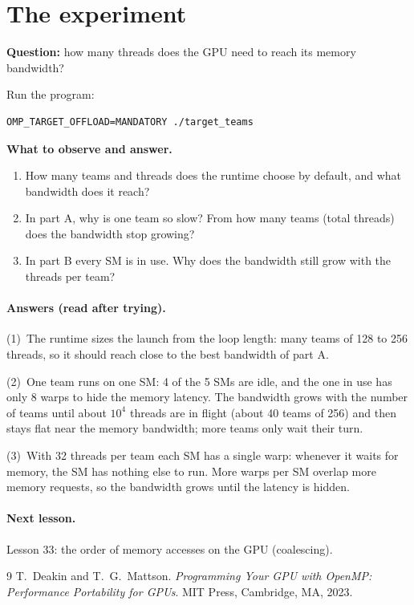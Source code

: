 \documentclass[11pt,a4paper]{article}
\begin{document}
\section{The experiment}
\begin{experiment}
\textbf{Question:} how many threads does the GPU need to reach its memory bandwidth?

Run the program:
\begin{lstlisting}[style=sh]
OMP_TARGET_OFFLOAD=MANDATORY ./target_teams
\end{lstlisting}

\textbf{What to observe and answer.}
\begin{enumerate}
  \item How many teams and threads does the runtime choose by default, and what bandwidth does
        it reach?
  \item In part A, why is one team so slow? From how many teams (total threads) does the
        bandwidth stop growing?
  \item In part B every SM is in use. Why does the bandwidth still grow with the threads per team?
\end{enumerate}
\end{experiment}

\paragraph{Answers (read after trying).}

\noindent(1)~The runtime sizes the launch from the loop length: many teams of 128 to 256
threads, so it should reach close to the best bandwidth of part A.

\noindent(2)~One team runs on one SM: 4 of the 5 SMs are idle, and the one in use has only 8
warps to hide the memory latency. The bandwidth grows with the number of teams until about
$10^4$ threads are in flight (about 40 teams of 256) and then stays flat near the memory
bandwidth; more teams only wait their turn.

\noindent(3)~With 32 threads per team each SM has a single warp: whenever it waits for memory,
the SM has nothing else to run. More warps per SM overlap more memory requests, so the
bandwidth grows until the latency is hidden.

\paragraph{Next lesson.} Lesson 33: the order of memory accesses on the GPU (coalescing).

\begin{thebibliography}{9}
 T.~Deakin and T.~G.~Mattson. \emph{Programming Your GPU with OpenMP: Performance
  Portability for GPUs}. MIT Press, Cambridge, MA, 2023.
\end{thebibliography}
\end{document}
